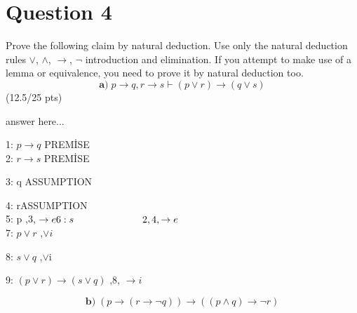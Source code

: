 \documentclass[a4paper,12pt]{article}
\newcommand\tab[1][1cm]{\hspace*{#1}}
\begin{document}
\section*{Question 4 \hfill {}}
\tab Prove the following claim by natural deduction. Use only the natural deduction rules $\vee$, $\wedge$, $\rightarrow$, $\neg$ introduction and elimination. If you attempt to make use of a lemma or equivalence, you need to prove it by natural deduction too.
\begin{equation*}
    \textbf{a)} \; p \rightarrow q, r \rightarrow s \vdash (p \vee r) \rightarrow (q \vee s)
\end{equation*}
\hfill \small{(12.5/25 pts)}\\
\begin{tcolorbox}
answer here...\\
\begin{tcolorbox}
1: $p \rightarrow q$ \quad\quad\quad\quad\quad PREMİSE \\
2: $r \rightarrow s$ \quad\quad\quad\quad\quad PREMİSE \\
\begin{tcolorbox}
3: q \quad \quad \quad\quad\quad\quad\quad ASSUMPTION \\
\begin{tcolorbox}
4: r\quad\quad\quad\quad\quad\quad\quad ASSUMPTION\\
5: p \quad \quad\quad\quad\quad\quad{},3, $\rightarrow e\\
6: s  \quad \quad\quad\quad\quad\quad\quad 2,4, \rightarrow e$\\
7: $p \lor r$ \quad\quad\quad\quad\quad{},$ \lor  i$\\
\end{tcolorbox}
8: $ s\lor q $ \quad{},$ \lor $i\\ 
\end{tcolorbox}
9: $(p\lor r) \rightarrow (s\lor q) $ ,8, $\rightarrow i$
\end{tcolorbox}
\vspace{1cm} %
\end{tcolorbox}
\begin{equation*}
     \textbf{b)} \;  (p \rightarrow (r \rightarrow \neg q)) \rightarrow ((p \wedge q) \rightarrow \neg r)
\end{equation*}
\end{document}
